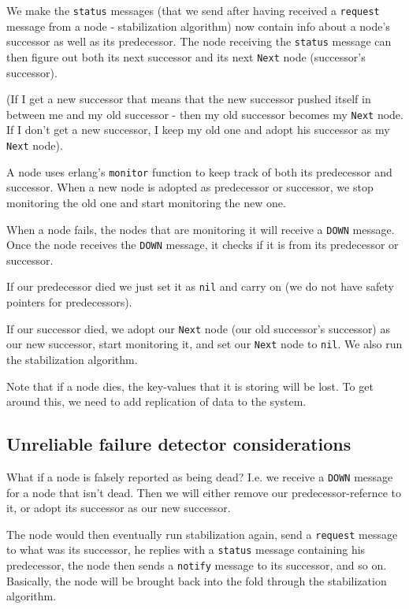 \documentclass[a4paper, 11pt]{article}
\begin{document}
We make the \texttt{status} messages (that we send after having received a \texttt{request} message from a node - stabilization algorithm) now contain info about a node's successor as well as its predecessor. The node receiving the \texttt{status} message can then figure out both its next successor and its next \texttt{Next} node (successor's successor).

(If I get a new successor that means that the new successor pushed itself in between me and my old successor - then my old successor becomes my \texttt{Next} node. If I don't get a new successor, I keep my old one and adopt his successor as my \texttt{Next} node).

A node uses erlang's \texttt{monitor} function to keep track of both its predecessor and successor. When a new node is adopted as predecessor or successor, we stop monitoring the old one and start monitoring the new one.

When a node fails, the nodes that are monitoring it will receive a \texttt{DOWN} message. Once the node receives the \texttt{DOWN} message, it checks if it is from its predecessor or successor. 

If our predecessor died we just set it as \texttt{nil} and carry on (we do not have safety pointers for predecessors). 

If our successor died, we adopt our \texttt{Next} node (our old successor's successor) as our new successor, start monitoring it, and set our \texttt{Next} node to \texttt{nil}. We also run the stabilization algorithm.

Note that if a node dies, the key-values that it is storing will be lost. To get around this, we need to add replication of data to the system.

\subsection{Unreliable failure detector considerations}

What if a node is falsely reported as being dead? I.e. we receive a \texttt{DOWN} message for a node that isn't dead.
Then we will either remove our predecessor-refernce to it, or adopt its successor as our new successor. 

The node would then eventually run stabilization again, send a \texttt{request} message to what was its successor, he replies with a \texttt{status} message containing his predecessor, the node then sends a \texttt{notify} message to its successor, and so on. Basically, the node will be brought back into the fold through the stabilization algorithm.
\end{document}
